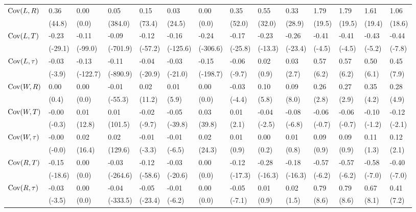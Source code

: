 {\begin{tabular}{@{}w{l}{6em}*{13}{w{c}{3em}}@{}}
    \quad $\mathrm{Cov}(L, R)$ & 0.36 & 0.00 & 0.05 & 0.15 & 0.03 & 0.00 & 0.35 & 0.55 & 0.33 & 1.79 & 1.79 & 1.61 & 1.06 \\
    & (44.8) & (0.0) & (384.0) & (73.4) & (24.5) & (0.0) & (52.0) & (32.0) & (28.9) & (19.5) & (19.5) & (19.4) & (18.6) \\
    \quad $\mathrm{Cov}(L, T)$ & -0.23 & -0.11 & -0.09 & -0.12 & -0.16 & -0.24 & -0.17 & -0.23 & -0.26 & -0.41 & -0.41 & -0.43 & -0.44 \\
    & (-29.1) & (-99.0) & (-701.9) & (-57.2) & (-125.6) & (-306.6) & (-25.8) & (-13.3) & (-23.4) & (-4.5) & (-4.5) & (-5.2) & (-7.8) \\
    \quad $\mathrm{Cov}(L, \tau)$ & -0.03 & -0.13 & -0.11 & -0.04 & -0.03 & -0.15 & -0.06 & 0.02 & 0.03 & 0.57 & 0.57 & 0.50 & 0.45 \\
    & (-3.9) & (-122.7) & (-890.9) & (-20.9) & (-21.0) & (-198.7) & (-9.7) & (0.9) & (2.7) & (6.2) & (6.2) & (6.1) & (7.9) \\
    \quad $\mathrm{Cov}(W, R)$ & 0.00 & 0.00 & -0.01 & 0.02 & 0.01 & 0.00 & -0.03 & 0.10 & 0.09 & 0.26 & 0.27 & 0.35 & 0.28 \\
    & (0.4) & (0.0) & (-55.3) & (11.2) & (5.9) & (0.0) & (-4.4) & (5.8) & (8.0) & (2.8) & (2.9) & (4.2) & (4.9) \\
    \quad $\mathrm{Cov}(W, T)$ & -0.00 & 0.01 & 0.01 & -0.02 & -0.05 & 0.03 & 0.01 & -0.04 & -0.08 & -0.06 & -0.06 & -0.10 & -0.12 \\
    & (-0.3) & (12.8) & (101.5) & (-9.7) & (-39.8) & (39.8) & (2.1) & (-2.5) & (-6.8) & (-0.7) & (-0.7) & (-1.2) & (-2.1) \\
    \quad $\mathrm{Cov}(W, \tau)$ & -0.00 & 0.02 & 0.02 & -0.01 & -0.01 & 0.02 & 0.01 & 0.00 & 0.01 & 0.09 & 0.09 & 0.11 & 0.12 \\
    & (-0.0) & (16.4) & (129.6) & (-3.3) & (-6.5) & (24.3) & (0.9) & (0.2) & (0.8) & (0.9) & (0.9) & (1.3) & (2.1) \\
    \quad $\mathrm{Cov}(R, T)$ & -0.15 & 0.00 & -0.03 & -0.12 & -0.03 & 0.00 & -0.12 & -0.28 & -0.18 & -0.57 & -0.57 & -0.58 & -0.40 \\
    & (-18.6) & (0.0) & (-264.6) & (-58.6) & (-20.6) & (0.0) & (-17.3) & (-16.3) & (-16.3) & (-6.2) & (-6.2) & (-7.0) & (-7.0) \\
    \quad $\mathrm{Cov}(R, \tau)$ & -0.03 & 0.00 & -0.04 & -0.05 & -0.01 & 0.00 & -0.05 & 0.01 & 0.02 & 0.79 & 0.79 & 0.67 & 0.41 \\
    & (-3.5) & (0.0) & (-333.5) & (-23.4) & (-6.2) & (0.0) & (-7.1) & (0.9) & (1.5) & (8.6) & (8.6) & (8.1) & (7.2) \\

\end{tabular}}
